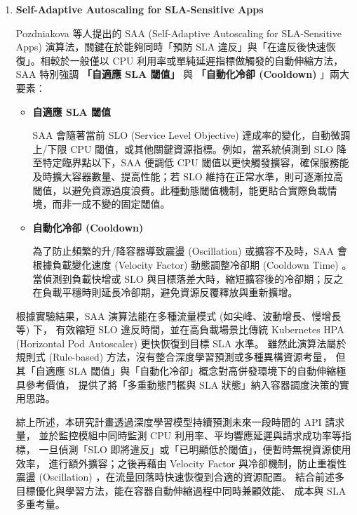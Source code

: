 \documentclass[12pt,a4paper]{article}
\begin{document}
\begin{enumerate}[label={(\zhdig*)}, leftmargin=2\parindent, listparindent=\parindent]
\begin{enumerate}[label={(\arabic*)}, leftmargin=\parindent, listparindent=\parindent]
\begin{enumerate}[label={(\zhdig*)}, leftmargin=\parindent, listparindent=\parindent]
\item \textbf{Self-Adaptive Autoscaling for SLA-Sensitive Apps\cite{23}}

    Pozdniakova 等人提出的 SAA (Self-Adaptive Autoscaling for SLA-Sensitive Apps) 演算法，關鍵在於能夠同時「預防 SLA 違反」與「在違反後快速恢復」。相較於一般僅以 CPU 利用率或單純延遲指標做觸發的自動伸縮方法，SAA 特別強調 \textbf{「自適應 SLA 閾值」} 與 \textbf{「自動化冷卻 (Cooldown) }」兩大要素：

    \begin{itemize}[leftmargin=\parindent, listparindent=\parindent]
	\item \textbf{自適應 SLA 閾值}

SAA 會隨著當前 SLO (Service Level Objective) 達成率的變化，自動微調上/下限 CPU 閾值，或其他關鍵資源指標。例如，當系統偵測到 SLO 降至特定臨界點以下，SAA 便調低 CPU 閾值以更快觸發擴容，確保服務能及時擴大容器數量、提高性能；若 SLO 維持在正常水準，則可逐漸拉高閾值，以避免資源過度浪費。此種動態閾值機制，能更貼合實際負載情境，而非一成不變的固定閾值。

	\item \textbf{自動化冷卻 (Cooldown) }

為了防止頻繁的升/降容器導致震盪 (Oscillation) 或擴容不及時，SAA 會根據負載變化速度 (Velocity Factor) 動態調整冷卻期 (Cooldown Time) 。當偵測到負載快增或 SLO 與目標落差大時，縮短擴容後的冷卻期；反之在負載平穩時則延長冷卻期，避免資源反覆釋放與重新擴增。
\end{itemize}

根據實驗結果，SAA 演算法能在多種流量模式 (如尖峰、波動增長、慢增長等) 下，
有效縮短 SLO 違反時間，並在高負載場景比傳統
Kubernetes HPA (Horizontal Pod Autoscaler) 更快恢復到目標 SLA 水準。
雖然此演算法屬於規則式 (Rule-based) 方法，沒有整合深度學習預測或多種異構資源考量，
但其「自適應 SLA 閾值」與「自動化冷卻」概念對高併發環境下的自動伸縮極具參考價值，
提供了將「多重動態門檻與 SLA 狀態」納入容器調度決策的實用思路。

綜上所述，本研究計畫透過深度學習模型持續預測未來一段時間的 API 請求量，
並於監控模組中同時監測 CPU 利用率、平均響應延遲與請求成功率等指標，
一旦偵測「SLO 即將違反」或「已明顯低於閾值」，便暫時無視資源使用效率，
進行額外擴容；之後再藉由 Velocity Factor 與冷卻機制，防止重複性震盪
(Oscillation) ，在流量回落時快速恢復到合適的資源配置。
結合前述多目標優化與學習方法，能在容器自動伸縮過程中同時兼顧效能、
成本與 SLA 多重考量。

    \end{enumerate}


\end{enumerate}
\end{enumerate}
\end{document}
